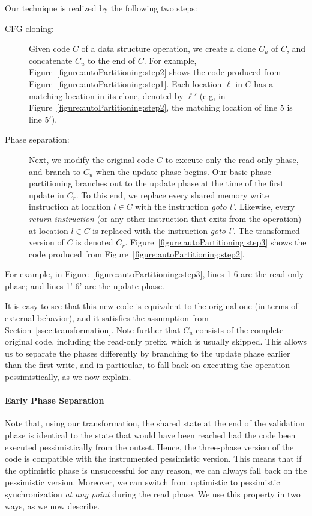 \noindent Our technique is realized by the following two steps:
\begin{description}
  \item [CFG cloning:]
Given code $C$ of a data structure operation, we create a clone $C_u$ of $C$, and concatenate $C_u$ to the end of $C$.
For example, Figure~\ref{figure:autoPartitioning:step2} shows the code produced from Figure~\ref{figure:autoPartitioning:step1}.
Each location $\ell$ in $C$ has a matching location in its clone, denoted by $\ell'$
(e.g, in Figure~\ref{figure:autoPartitioning:step2}, the matching location of line $5$ is line $5'$).
  \item [Phase separation:]
Next, we modify the original code $C$ to execute only the read-only phase, and branch to $C_u$ when the
update phase begins. Our basic phase partitioning branches out to the update phase at the time of the first update in $C_r$.
To this end, we replace every shared memory write instruction
at location $l \in C$ with the instruction \emph{goto l'}.
Likewise, every \emph{return instruction} (or any other instruction that exits from the operation)
at location $l \in C$ is replaced with the instruction \emph{goto l'}.
The transformed version of $C$ is denoted $C_r$.
Figure~\ref{figure:autoPartitioning:step3} shows the code produced from Figure~\ref{figure:autoPartitioning:step2}.
\end{description}


For example, in Figure~\ref{figure:autoPartitioning:step3}, lines 1-6 are the read-only phase; and lines 1'-6' are the update phase.

It is easy to see that this new code is equivalent to the original one (in terms of external behavior), and it satisfies the assumption from Section~\ref{ssec:transformation}. Note further that $C_u$ consists of the complete original code, including
the read-only prefix, which is usually skipped. This allows us to separate the phases differently by branching to
the update phase earlier than the first write, and in particular, to fall back on executing the
operation pessimistically, as we now explain.

\paragraph{Early Phase Separation}
Note that, using our transformation, the shared state at the end of the validation phase
is identical to the state that would have been reached had the code been executed pessimistically from
the outset. Hence, the three-phase version of the code is compatible with the instrumented
pessimistic version. This means that if the optimistic phase is unsuccessful for any reason, we can always
fall back on the pessimistic version. Moreover, we can switch from optimistic to pessimistic synchronization
\emph{at any point} during the read phase.
We use this property in two ways, as we now describe.


